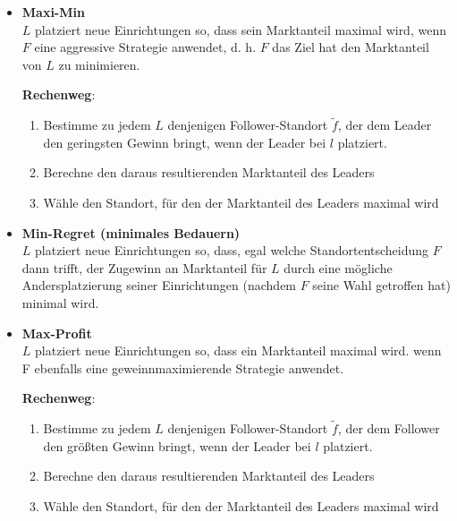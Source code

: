         \begin{itemize}
          \item \textbf{Maxi-Min} \\
          $L$ platziert neue Einrichtungen so, dass sein Marktanteil maximal wird, wenn $F$ eine aggressive Strategie anwendet, d. h. $F$ das Ziel hat den Marktanteil von $L$ zu minimieren.

          \begin{framed}
            \textbf{Rechenweg}:
            \begin{enumerate}
              \item Bestimme zu jedem $L$ denjenigen Follower-Standort $\tilde{f}$, der dem Leader den geringsten Gewinn bringt, wenn der Leader bei $l$ platziert.
              \item Berechne den daraus resultierenden Marktanteil des Leaders
              \item Wähle den Standort, für den der Marktanteil des Leaders maximal wird
            \end{enumerate}
          \end{framed}
          
          \item \textbf{Min-Regret (minimales Bedauern)}\\
          $L$ platziert neue Einrichtungen so, dass, egal welche Standortentscheidung $F$ dann trifft, der Zugewinn an Marktanteil für $L$ durch eine mögliche Andersplatzierung seiner Einrichtungen (nachdem $F$ seine Wahl getroffen hat) minimal wird.

          \item \textbf{Max-Profit}\\
          $L$ platziert neue Einrichtungen so, dass ein Marktanteil maximal wird. wenn F ebenfalls eine geweinnmaximierende Strategie anwendet.

          \begin{framed}
            \textbf{Rechenweg}:
            \begin{enumerate}
              \item Bestimme zu jedem $L$ denjenigen Follower-Standort $\tilde{f}$, der dem Follower den größten Gewinn bringt, wenn der Leader bei $l$ platziert.
              \item Berechne den daraus resultierenden Marktanteil des Leaders
              \item Wähle den Standort, für den der Marktanteil des Leaders maximal wird
            \end{enumerate}
          \end{framed}

        \end{itemize}

